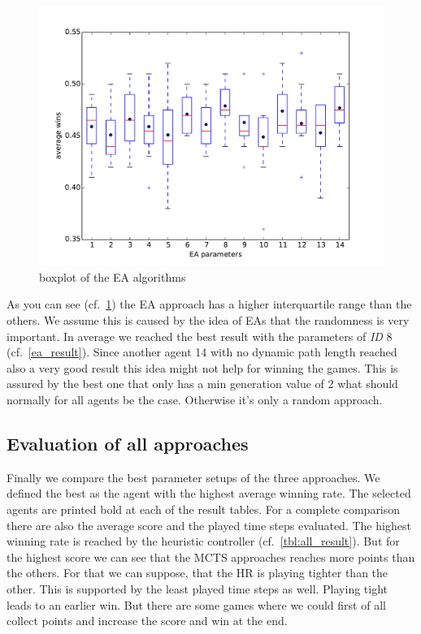 \begin{figure}[H]
\centering
\includegraphics[scale=0.6]{images/eval_evolutionary.pdf}
\caption{boxplot of the \ac{EA} algorithms}
\label{fig:eval_evo}
\end{figure}

As you can see (cf.~\cref{fig:eval_evo}) the \ac{EA} approach has a higher
interquartile range than the others.
We assume this is caused by the idea of \acp{EA} that the randomness is very important.
In average we reached the best result with the parameters of \textit{ID} 8 (cf.~\cref{ea_result}). 
Since another agent 14 with no dynamic path length reached also a very good result this idea might
not help for winning the games. This is assured by the best one that only has a min generation value 
of 2 what should normally for all agents be the case. Otherwise it's only a random approach.




\subsection{Evaluation of all approaches} 

Finally we compare the best parameter setups of the three approaches. We defined the best as the agent with the highest average winning rate.
The selected agents are printed bold at each of the result tables.
For a complete comparison there are also the average score and the played time steps evaluated.
The highest winning rate is reached by the heuristic controller (cf.~\cref{tbl:all_result}).
But for the highest score we can see that the \ac{MCTS} approaches reaches more points than the others.
For that we can suppose, that the \ac{HR} is playing tighter than the other. This is supported by the least played time steps as well.
Playing tight leads to an earlier win. But there are some games where we could first of all collect points and increase the score and
win at the end.


